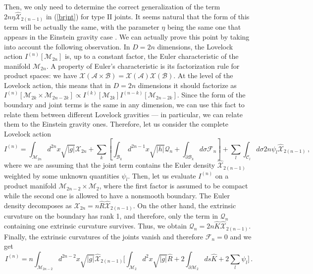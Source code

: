 \documentclass[11pt,letterpaper]{article}
\begin{document}
Then, we only need to determine the correct generalization of the term $2n\eta \hat{\mathcal{X}}_{2(n-1)}$ in (\ref{brjnt}) for type II joints. It seems natural that the form of this term will be actually the same, with the parameter $\eta$ being the same one that appears in the Einstein gravity case \cite{Lehner:2016vdi}. We can actually prove this point by taking into account the following observation. In $D=2n$ dimensions, the Lovelock action  $I^{(n)}[\mathcal{M}_{2n}]$ is, up to a constant factor, the Euler characteristic of the manifold $\mathcal{M}_{2n}$. A property of Euler's characteristic is its factorization rule for product spaces: we have $\mathcal{X}(\mathcal{A}\times\mathcal{B})=\mathcal{X}(\mathcal{A})\mathcal{X}(\mathcal{B})$. At the level of the Lovelock action, this means that in $D=2n$ dimensions it should factorize as $I^{(n)}[\mathcal{M}_{2k}\times\mathcal{M}_{2n-2k}]\propto I^{(k)}[\mathcal{M}_{2k}]I^{(n-k)}[\mathcal{M}_{2n-2k}]$. Since the form of the boundary and joint terms is the same in any dimension, we can use this fact to relate them between different Lovelock gravities --- in particular, we can relate them to the Einstein gravity ones. Therefore, let us consider the complete Lovelock action 
\begin{equation}
I^{(n)}=\int_{\mathcal{M}_{2n}}d^{2n}x\sqrt{|g|}\mathcal{X}_{2n}+ \sum_k\left[\int_{\mathcal{B}_k}d^{2n-1}x\sqrt{|h|}\mathcal{Q}_{n}+\int_{\partial \mathcal{B}_k}d\sigma \mathcal{F}_n\right]+\sum_l\int_{\mathcal{C}_l}d\sigma 2n\psi_l \hat{\mathcal{X}}_{2(n-1)}\, ,
\end{equation}
where we are assuming that the joint term contains the Euler density $\hat{\mathcal{X}}_{2(n-1)}$ weighted by some unknown quantities $\psi_l$. Then, let us evaluate $I^{(n)}$ on a product manifold $\mathcal{M}_{2n-2}\times\mathcal{M}_2$, where the first factor is assumed to be compact while the second one is allowed to have a nonsmooth boundary. The Euler density decomposes as $\mathcal{X}_{2n}=n \hat R\hat{\mathcal{X}}_{2(n-1)}$. On the other hand, the extrinsic curvature on the boundary has rank 1, and therefore, only the term in $ \mathcal{Q}_{n}$ containing one extrinsic curvature survives. Thus, we obtain $ \mathcal{Q}_{n}=2n \hat K \hat{\mathcal{X}}_{2(n-1)}$. Finally, the extrinsic curvatures of the joints vanish and therefore $\mathcal{F}_n=0$ and we get
\begin{equation}
I^{(n)}=n\int_{\mathcal{M}_{2n-2}}d^{2n-2}x\sqrt{|g|}\hat{\mathcal{X}}_{2(n-1)}\Bigg[\int_{\mathcal{M}_{2}}d^{2}x\sqrt{|g|}\hat{R} +2\int_{\partial \mathcal{M}_2}ds \hat K+2\sum_l\psi_l\Bigg]\, .
\end{equation}
\end{document}
